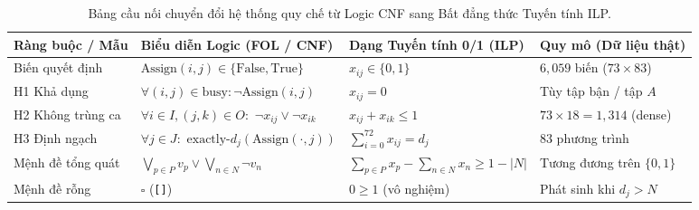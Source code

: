 \begin{table}[htbp]
\centering
\caption{Bảng cầu nối chuyển đổi hệ thống quy chế từ Logic CNF sang Bất đẳng thức Tuyến tính ILP.}
\label{tab:logic_to_lp_real}
\small
\setlength{\tabcolsep}{5pt}
\renewcommand{\arraystretch}{1.25}
\begin{tabularx}{\textwidth}{@{} >{\raggedright\arraybackslash}p{2.8cm} L L >{\raggedright\arraybackslash}p{3.1cm} @{}}
\toprule
\textbf{Ràng buộc / Mẫu} & \textbf{Biểu diễn Logic (FOL / CNF)} & \textbf{Dạng Tuyến tính 0/1 (ILP)} & \textbf{Quy mô (Dữ liệu thật)} \\
\midrule
Biến quyết định & $\text{Assign}(i, j) \in \{\text{False}, \text{True}\}$ & $x_{ij} \in \{0, 1\}$ & $6{,}059$ biến ($73 \times 83$) \\
H1 Khả dụng & $\forall (i,j)\in\text{busy}: \neg \text{Assign}(i,j)$ & $x_{ij} = 0$ & Tùy tập bận / tập $A$ \\
H2 Không trùng ca & $\forall i \in I, (j,k)\in O:$ \newline $\neg x_{ij} \lor \neg x_{ik}$ & $x_{ij} + x_{ik} \le 1$ & $73 \times 18 = 1{,}314$ (dense) \\
H3 Định ngạch & $\forall j \in J:$ \newline $\text{exactly-}d_j(\text{Assign}(\cdot, j))$ & $\sum_{i=0}^{72} x_{ij} = d_j$ & $83$ phương trình \\
Mệnh đề tổng quát & $\bigvee_{p\in P} v_p \lor \bigvee_{n\in N} \neg v_n$ & $\sum_{p\in P} x_p - \sum_{n\in N} x_n \ge 1 - |N|$ & Tương đương trên $\{0,1\}$ \\
Mệnh đề rỗng & $\square$ (\texttt{[]}) & $0 \ge 1$ (vô nghiệm) & Phát sinh khi $d_j > N$ \\
\bottomrule
\end{tabularx}
\end{table}

